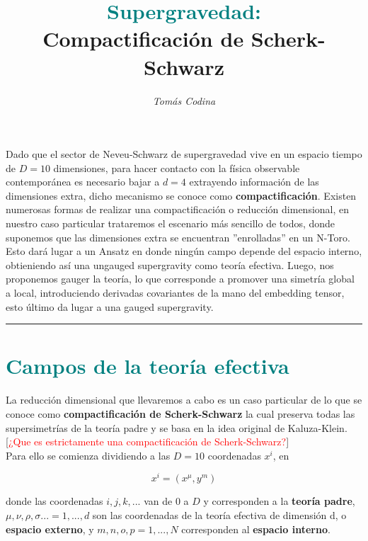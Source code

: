 \documentclass{article}
\title{\vspace{-35pt}\huge{\textbf{\textcolor{teal}{Supergravedad:}}} \\ \vspace{0.1cm} \large{\textbf{Compactificación de Scherk-Schwarz}}}
\date{\vspace{-20pt}}
\author{\textit{Tomás Codina}}
\numberwithin{equation}{section}
\begin{document}
\maketitle
\thispagestyle{fancy}






Dado que el sector de Neveu-Schwarz de supergravedad vive en un espacio tiempo de $ D=10 $ dimensiones, para hacer contacto con la física observable contemporánea es necesario bajar a $ d=4 $ extrayendo información de las dimensiones extra, dicho  mecanismo se conoce como \textbf{compactificación}. Existen numerosas formas de realizar una compactificación o reducción dimensional, en nuestro caso particular trataremos el escenario más sencillo de todos, donde suponemos que las dimensiones extra se encuentran ''enrolladas'' en un N-Toro. Esto dará lugar a un Ansatz en donde ningún campo depende del espacio interno, obtieniendo así una ungauged supergravity como teoría efectiva. Luego, nos proponemos gauger la teoría, lo que corresponde a promover una simetría global a local, introduciendo derivadas covariantes de la mano del embedding tensor, esto último da lugar a una gauged supergravity. 

\rule{\textwidth}{0.4pt}

\section{\textcolor{teal}{Campos de la teoría efectiva}}\label{sec_preliminares}

La reducción dimensional que llevaremos a cabo es un caso particular de lo que se conoce como \textbf{compactificación de Scherk-Schwarz} la cual preserva todas las supersimetrías de la teoría padre y se basa en la idea original de Kaluza-Klein.\\

[\textcolor{red}{¿Que es estrictamente una compactificación de Scherk-Schwarz?}]\\

Para ello se comienza dividiendo a las $ D=10 $ coordenadas $ x^{i} $, en

\begin{equation}
x^i = (x^{\mu},y^m)
\end{equation}

donde las coordenadas $ i,j,k,... $ van de $ 0 $ a $ D $ y corresponden a la \textbf{teoría padre}, $\mu,\nu,\rho,\sigma...=1,...,d $ son las coordenadas de la teoría efectiva de dimensión d, o \textbf{espacio externo}, y $ m,n,o,p=1,...,N $ corresponden al \textbf{espacio interno}.
\end{document}
